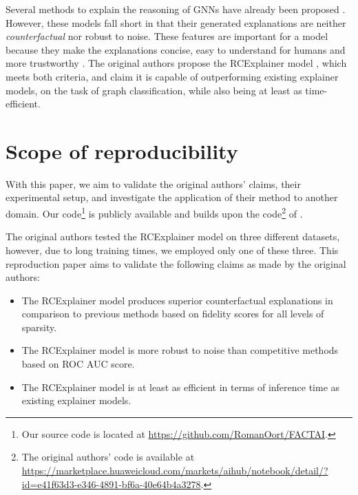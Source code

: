 Several methods to explain the reasoning of GNNs have already been proposed \cite{velickovic2018graph, ying2019gnnexplainer, Pope2019ExplainabilityMF,  luo2020parameterized}. However, these models fall short in that their generated explanations are neither \textit{counterfactual} nor robust to noise. These features are important for a model because they make the explanations concise, easy to understand for humans and more trustworthy \cite{bajaj2021robust}. The original authors propose the RCExplainer model \cite{bajaj2021robust}, which meets both criteria, and claim it is capable of outperforming existing explainer models, on the task of graph classification, while also being at least as time-efficient.

\section{Scope of reproducibility} \label{sec:claims}

With this paper, we aim to validate the original authors' claims, their experimental setup, and investigate the application of their method to another domain. Our code\footnote{Our source code is located at \href{https://github.com/RomanOort/FACTAI}{https://github.com/RomanOort/FACTAI}.} is publicly available and builds upon the code\footnote{The original authors' code is available at \href{https://marketplace.huaweicloud.com/markets/aihub/notebook/detail/?id=e41f63d3-e346-4891-bf6a-40e64b4a3278}{https://marketplace.huaweicloud.com/markets/aihub/notebook/detail/?id=e41f63d3-e346-4891-bf6a-40e64b4a3278}.} of \citep{bajaj2021robust}.

The original authors tested the RCExplainer model on three different datasets, however, due to long training times, we employed only one of these three. This reproduction paper aims to validate the following claims as made by the original authors:

\begin{itemize}
    \item The RCExplainer model produces superior counterfactual explanations in comparison to previous methods based on fidelity scores for all levels of sparsity. 
   
    \item The RCExplainer model is more robust to noise than competitive methods based on ROC AUC score. 
  
    \item The RCExplainer model is at least as efficient in terms of inference time as existing explainer models.
\end{itemize}
 
